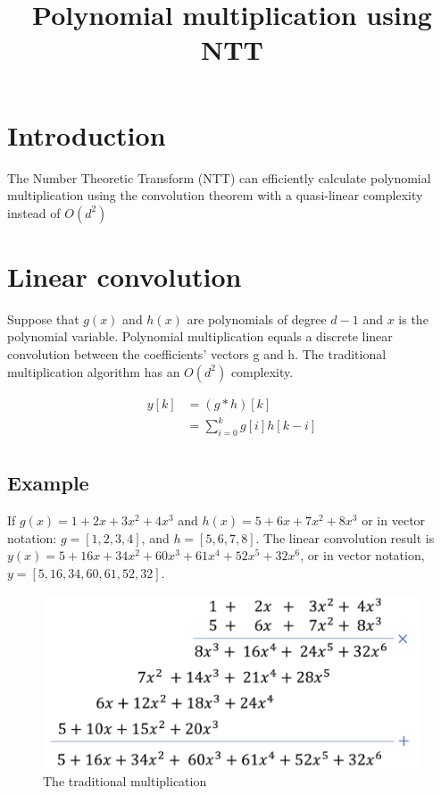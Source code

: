 \documentclass{techrep}
\title{Polynomial multiplication using NTT}
\theoremstyle{definition}
\theoremstyle{plain}
\begin{document}
	\maketitle

	\section{Introduction}
	The Number Theoretic Transform (NTT) can efficiently calculate polynomial multiplication using the convolution theorem with a quasi-linear complexity instead of $O(d^2)$

	\section{Linear convolution}
	Suppose that $g(x)$ and $h(x)$ are polynomials of degree $d - 1$ and $x$ is the polynomial variable. Polynomial multiplication equals a discrete linear convolution between the coefficients’ vectors g and h. The traditional multiplication algorithm has an $O(d^2)$ complexity.

	\begin{align*}
		y[k] &= (g*h)[k] \\
		&= \sum_{i=0}^{k}g[i]h[k-i] \\
	\end{align*}

	\subsection{Example}
	If $g(x) = 1 + 2x + 3x^2 + 4x^3$ and $h(x) = 5 + 6x + 7x^2 + 8x^3$ or in vector notation:  $g = [1, 2, 3, 4]$, and $h = [5, 6, 7, 8]$. The linear convolution result is $y(x) = 5 + 16x + 34x^2 + 60x^3 + 61x^4 + 52x^5 + 32x^6$, or in vector notation, $y = [5, 16, 34, 60, 61, 52, 32]$.

	\begin{figure}[H]
		\centering
		\includegraphics[width=.7\columnwidth]{fig/trad_mult.png}
		\caption{The traditional multiplication}
		\label{fig:TradMult}
	\end{figure}
\end{document}

